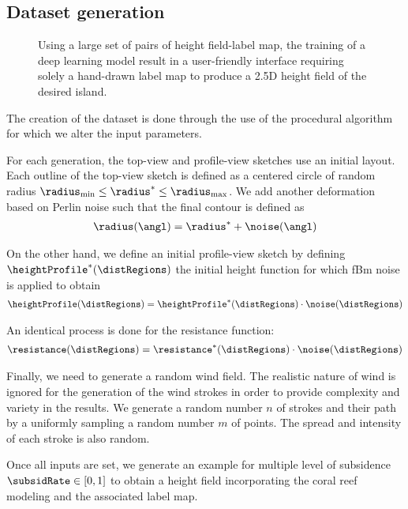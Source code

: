 \documentclass{egpubl}
\begin{document}
\subsection{Dataset generation}
\label{sec:coral-island_dataset-generation}


\begin{figure}
	\centering
    \caption{Using a large set of pairs of height field-label map, the training of a deep learning model result in a user-friendly interface requiring solely a hand-drawn label map to produce a 2.5D height field of the desired island.}
    \label{fig:coral-island_cGAN-pipeline}
\end{figure}


The creation of the dataset is done through the use of the procedural algorithm for which we alter the input parameters. 

For each generation, the top-view and profile-view sketches use an initial layout. Each outline of the top-view sketch is defined as a centered circle of random radius $\radius_\text{min} \leq \radius^* \leq \radius_\text{max}$. We add another deformation based on Perlin noise such that the final contour is defined as 
\begin{align}
    \radius(\angl) = \radius^* + \noise(\angl)
\end{align}

On the other hand, we define an initial profile-view sketch by defining $\heightProfile^*(\distRegions)$ the initial height function for which fBm noise is applied to obtain 
\begin{align}
    \heightProfile(\distRegions) = \heightProfile^*(\distRegions) \cdot \noise(\distRegions)
\end{align}

An identical process is done for the resistance function:
\begin{align}
    \resistance(\distRegions) = \resistance^*(\distRegions) \cdot \noise(\distRegions)
\end{align}

Finally, we need to generate a random wind field. The realistic nature of wind is ignored for the generation of the wind strokes in order to provide complexity and variety in the results. 
We generate a random number $n$ of strokes and their path by a uniformly sampling a random number $m$ of points. The spread and intensity of each stroke is also random.

Once all inputs are set, we generate an example for multiple level of subsidence $\subsidRate \in [0, 1]$ to obtain a height field incorporating the coral reef modeling and the associated label map. 
\end{document}
